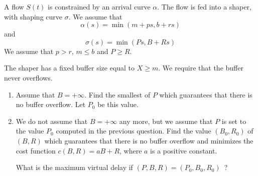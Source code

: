 \begin{problem}
A flow $S(t)$ is constrained by an arrival curve $\alpha$. The
flow is fed into a shaper, with shaping curve $\sigma$. We assume
that
$$
\alpha(s) = \min (m + ps, b +rs)
$$
and
$$
\sigma (s) = \min ( Ps, B+Rs )
$$
We assume that $p>r$, $m \leq b$ and $P \geq R$.

The shaper has a fixed buffer size equal to $X \geq m$. We require
that the buffer never overflows.

\begin{enumerate}
        \item Assume that $B=+\infty$.  Find the smallest
        of $P$ which guarantees that there is no buffer overflow.
        Let $P_{0}$ be this value.

        \item We do not assume that $B=+ \infty$ any more, but we
        assume that $P$ is set to the value $P_{0}$ computed in the
        previous question.  Find the value $(B_{0}, R_{0})$ of $(B,R)$  which
        guarantees that there is no buffer overflow and minimizes the cost
        function $c(B,R)= aB + R$, where $a$ is a positive constant.

        What is the
        maximum virtual delay if $(P, B, R)=(P_{0},B_{0}, R_{0})$~?
\end{enumerate}
\end{problem}

